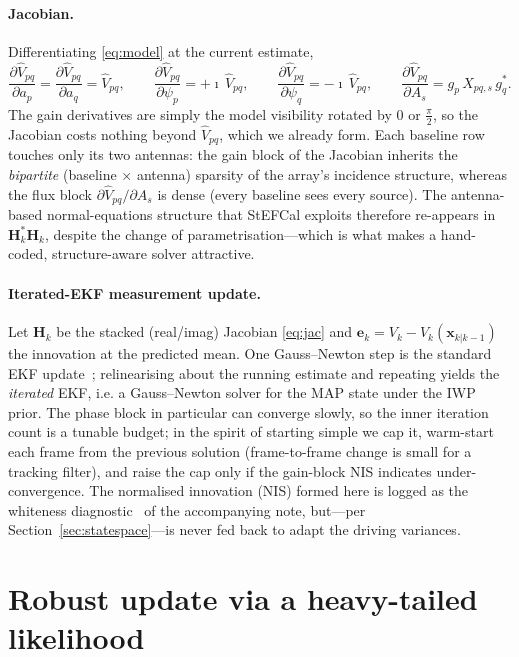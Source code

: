 \documentclass[11pt]{article}
\begin{document}
\paragraph{Jacobian.} Differentiating \eqref{eq:model} at the current estimate,
\begin{equation}
  \frac{\partial \hat V_{pq}}{\partial a_p}=\frac{\partial \hat V_{pq}}{\partial a_q}=\hat V_{pq},
  \qquad
  \frac{\partial \hat V_{pq}}{\partial \psi_p}=+\imath\,\hat V_{pq},
  \qquad
  \frac{\partial \hat V_{pq}}{\partial \psi_q}=-\imath\,\hat V_{pq},
  \qquad
  \frac{\partial \hat V_{pq}}{\partial A_s}=g_p\,X_{pq,s}\,g_q^{\ast}.
  \label{eq:jac}
\end{equation}
The gain derivatives are simply the model visibility rotated by $0$ or $\tfrac{\pi}{2}$, so the
Jacobian costs nothing beyond $\hat V_{pq}$, which we already form. Each baseline row touches
only its two antennas: the gain block of the Jacobian inherits the \emph{bipartite}
(baseline$\,\times\,$antenna) sparsity of the array's incidence structure, whereas the flux
block $\partial\hat V_{pq}/\partial A_s$ is dense (every baseline sees every source). The
antenna-based normal-equations structure that StEFCal exploits therefore re-appears in
$\bm{H}_k^{\ast}\bm{H}_k$, despite the change of parametrisation---which is what makes a
hand-coded, structure-aware solver attractive.

\paragraph{Iterated-EKF measurement update.} Let $\bm{H}_k$ be the stacked (real/imag) Jacobian
\eqref{eq:jac} and $\bm{e}_k=V_k-\hat V_k(\bm{x}_{k|k-1})$ the innovation at the predicted mean.
One Gauss--Newton step is the standard EKF update~\cite{barshalom}; relinearising about the running estimate and
repeating yields the \emph{iterated} EKF, i.e. a Gauss--Newton solver for the MAP state under
the IWP prior. The phase block in particular can converge slowly, so the inner iteration count is
a tunable budget; in the spirit of starting simple we cap it, warm-start each frame from the
previous solution (frame-to-frame change is small for a tracking filter), and raise the cap only if
the gain-block NIS indicates under-convergence. The normalised innovation (NIS) formed here is logged
as the whiteness diagnostic~\cite{kailath} of the accompanying note, but---per
Section~\ref{sec:statespace}---is never fed back to adapt the driving variances.

\section{Robust update via a heavy-tailed likelihood}
\label{sec:robust}
\end{document}

